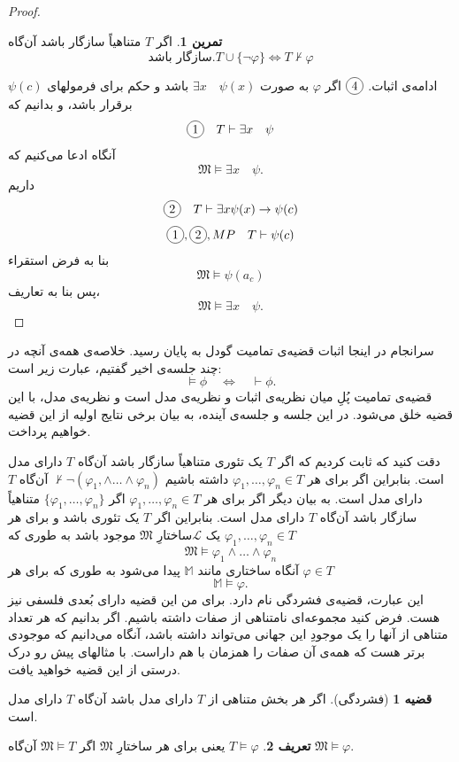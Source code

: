 \documentclass[12pt,a4paper]{article}
\theoremstyle{definition}
\newtheorem{thm}{قضیه}
\newtheorem{tamrin}{تمرین}
\newtheorem{defn}[thm]{تعریف}
\newcommand*\circled[1]{\tikz[baseline=(char.base)]{
		\node[shape=circle,draw,inner sep=2pt] (char) {#1};}}
\begin{document}
\begin{proof}
		\begin{tamrin}

			اگر 
			$ T $
			متناهیاً سازگار باشد آن‌گاه 
			\[ \text{سازگار باشد.}T\cup\{\neg \varphi\} \iff T\not\vdash\varphi \]
		\end{tamrin}
ادامه‌ی اثبات.
		$ \circled{4} $
		اگر 
		$ \varphi $
		به صورت 
		$ \exists x \quad \psi(x) $
		باشد و حکم برای فرمولهای
		$\psi(c)$
		برقرار باشد،  و بدانیم که
		\[ \circled{1} \quad T \vdash \exists x \quad \psi \]
آنگاه ادعا می‌کنیم که
$$ \mathfrak{M} \models \exists x \quad \psi. $$
داریم
		\[ \circled{2} \quad T \vdash \exists x \psi(x) \to \psi(c) \]
		\[ \circled{1},\circled{2},MP  \quad T\vdash \psi(c) \]
		بنا به فرض استقراء
		\[ \mathfrak{M} \models \psi(a_c) \]
		پس بنا به تعاریف،
		\[ \mathfrak{M}\models \exists x \quad \psi. \]
	\end{proof}
سرانجام در اینجا اثبات قضیه‌ی تمامیت گودل به پایان رسید. خلاصه‌ی همه‌ی آنچه در چند جلسه‌ی اخیر گفتیم، عبارت زیر است:
\[
\models \phi \quad \Leftrightarrow \quad \vdash \phi.
\]
قضیه‌ی تمامیت پُلِ میان نظریه‌ی اثبات و نظریه‌ی مدل است و نظریه‌ی مدل، با این قضیه خلق می‌شود. در این جلسه و جلسه‌ی آینده، به بیان برخی نتایج اولیه از  این قضیه خواهیم پرداخت.
\par 
دقت کنید که
	ثابت کردیم که اگر 
	$ T $
	یک تئوری متناهیاً سازگار باشد آن‌گاه 
	$ T $
	دارای مدل است. بنابراین اگر برای هر 
	$ \varphi_1,\ldots,\varphi_n\in T $
	داشته باشیم 
	$ \not\vdash \neg(\varphi_1,\wedge\ldots\wedge\varphi_n) $
	آن‌گاه 
	$ T $
	دارای مدل است. به بیان دیگر اگر برای هر 
	$ \varphi_1,\ldots,\varphi_n\in T $
	اگر 
	$ \{ \varphi_1,\ldots,\varphi_n \} $
متناهیاً
	سازگار باشد آن‌گاه 
	$ T $
	دارای مدل است. بنابراین اگر 
	$ T $
	یک تئوری باشد و برای هر 
	$ \varphi_1,\ldots,\varphi_n\in T $
	یک 
	$ \mathcal{L} $ساختارِ
	$ \mathfrak{M} $
	موجود باشد به طوری که 
	\[ \mathfrak{M}\models \varphi_1\wedge\ldots\wedge\varphi_n \]
	آنگاه ساختاری مانند 
	$ \mathbb{M}$
	پیدا می‌شود به طوری که برای هر 
	$ \varphi\in T $
	\[ \mathbb{M}\models \varphi. \]
این عبارت، قضیه‌ی فشردگی نام دارد. برای من این قضیه دارای بُعدی فلسفی نیز هست. فرض کنید مجموعه‌ای نامتناهی از صفات داشته باشیم. اگر بدانیم که هر تعداد متناهی از آنها را یک موجودِ این جهانی می‌تواند داشته باشد، آنگاه می‌دانیم که موجودی برتر هست که همه‌ی آن صفات را همزمان با هم داراست.  با مثالهای پیش رو درک درستی از این قضیه خواهید یافت.
	\begin{thm}[فشردگی]
		اگر هر بخش متناهی از 
		$ T $
		دارای مدل باشد آن‌گاه 
		$ T $
		دارای مدل است.
	\end{thm}
	\begin{defn}
		$ T\models\varphi $
		یعنی برای هر ساختارِ 
		$ \mathfrak{M} $
		اگر 
		$ \mathfrak{M}\models T $
		آن‌گاه 
		$ \mathfrak{M}\models \varphi $.
	\end{defn}
\end{document}
